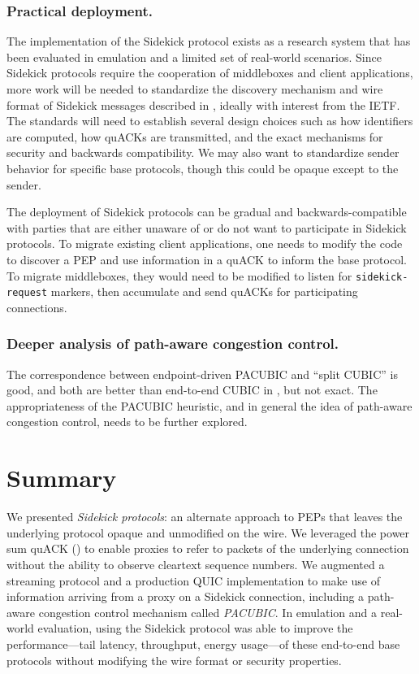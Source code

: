\subsubsection{Practical deployment.}

The implementation of the Sidekick protocol exists as a research system that has
been evaluated in emulation and a limited set of real-world scenarios. Since
Sidekick protocols require the cooperation of middleboxes and client
applications, more work will be needed to standardize the discovery mechanism
and wire format of Sidekick messages described in
, ideally with interest from the IETF. The
standards will need to establish several design choices such as how identifiers
are computed, how quACKs are transmitted, and the exact mechanisms for security
and backwards compatibility. We may also want to standardize sender behavior
for specific base protocols, though this could be opaque except to the sender.

The deployment of Sidekick protocols can be gradual and backwards-compatible
with parties that are either unaware of or do not want to participate in
Sidekick protocols.
To migrate existing client applications, one needs to modify the code to
discover a PEP and use information in a quACK to inform the base protocol.
To migrate middleboxes, they would need to be modified to listen for
\texttt{sidekick-request} markers, then accumulate and send quACKs for participating
connections.

\subsubsection{Deeper analysis of path-aware congestion control.}

The correspondence between endpoint-driven PACUBIC and ``split CUBIC'' is good,
and both are better than end-to-end CUBIC in ,
but not exact. The appropriateness of the PACUBIC heuristic, and in general the
idea of path-aware congestion control, needs to be further explored.

\section{Summary}
\label{sec:sidekick:summary}

We presented \textit{Sidekick protocols}: an alternate approach to PEPs that
leaves the underlying protocol opaque and unmodified on the wire. We leveraged
the power sum quACK () to enable proxies to refer
to packets of the underlying connection without the ability to observe
cleartext sequence numbers. We augmented a streaming protocol and a production
QUIC implementation to make use of information arriving
from a proxy on a Sidekick connection, including a path-aware congestion control
mechanism called \textit{PACUBIC}. In emulation and a real-world evaluation,
using the Sidekick protocol was able to improve the performance---tail latency,
throughput, energy usage---of these end-to-end base protocols without
modifying the wire format or security properties.
